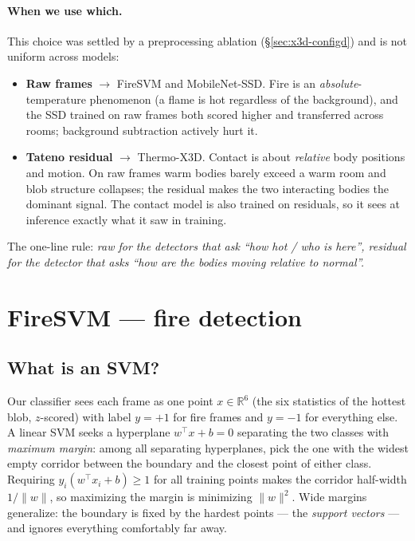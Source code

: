 \documentclass[11pt]{article}
\begin{document}
\paragraph{When we use which.} This choice was settled by a preprocessing
ablation (\S\ref{sec:x3d-configd}) and is not uniform across models:
\begin{itemize}
\item \textbf{Raw frames} $\rightarrow$ FireSVM and MobileNet-SSD. Fire is
      an \emph{absolute}-temperature phenomenon (a flame is hot regardless
      of the background), and the SSD trained on raw frames both scored
      higher and transferred across rooms; background subtraction actively
      hurt it.
\item \textbf{Tateno residual} $\rightarrow$ Thermo-X3D. Contact is about
      \emph{relative} body positions and motion. On raw frames warm bodies
      barely exceed a warm room and blob structure collapses; the residual
      makes the two interacting bodies the dominant signal. The contact
      model is also trained on residuals, so it sees at inference exactly
      what it saw in training.
\end{itemize}
The one-line rule: \emph{raw for the detectors that ask ``how hot / who is
here'', residual for the detector that asks ``how are the bodies moving
relative to normal''.}

\section{FireSVM --- fire detection}

\subsection{What is an SVM?}

Our classifier sees each frame as one point $x\in\mathbb{R}^6$ (the six
statistics of the hottest blob, $z$-scored) with label $y{=}{+}1$ for fire
frames and $y{=}{-}1$ for everything else. A linear SVM seeks a hyperplane
$w^\top x+b=0$ separating the two classes with \emph{maximum margin}: among
all separating hyperplanes, pick the one with the widest empty corridor
between the boundary and the closest point of either class. Requiring
$y_i(w^\top x_i+b)\geq 1$ for all training points makes the corridor
half-width $1/\|w\|$, so maximizing the margin is minimizing $\|w\|^2$.
Wide margins generalize: the boundary is fixed by the hardest points ---
the \emph{support vectors} --- and ignores everything comfortably far away.
\end{document}
